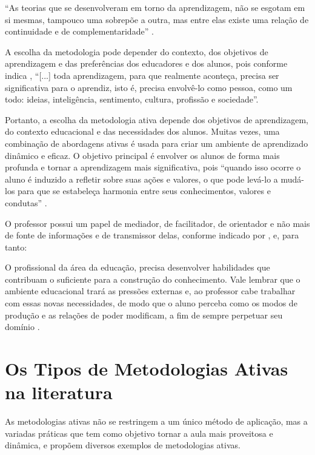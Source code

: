 ``As teorias que se desenvolveram em torno da aprendizagem, não se esgotam em si mesmas, tampouco uma sobrepõe a outra, mas entre elas existe uma relação de continuidade e de complementaridade'' \cite[p. 5]{LACERDA2023}.

A escolha da metodologia pode depender do contexto, dos objetivos de aprendizagem e das preferências dos educadores e dos alunos, pois conforme indica , ``[...] toda aprendizagem, para que realmente aconteça, precisa ser significativa para o aprendiz, isto é, precisa envolvê-lo como pessoa, como um todo: ideias, inteligência, sentimento, cultura, profissão e sociedade''.

Portanto, a escolha da metodologia ativa depende dos objetivos de aprendizagem, do contexto educacional e das necessidades dos alunos. Muitas vezes, uma combinação de abordagens ativas é usada para criar um ambiente de aprendizado dinâmico e eficaz. O objetivo principal é envolver os alunos de forma mais profunda e tornar a aprendizagem mais significativa, pois ``quando isso ocorre o aluno é induzido a refletir sobre suas ações e valores, o que pode levá-lo a mudá-los para que se estabeleça harmonia entre seus conhecimentos, valores e condutas'' \cite[p. 315]{FRASSON2019}.

O professor possui um papel de mediador, de facilitador, de orientador e não mais de fonte de informações e de transmissor delas, conforme indicado por 
, e, para tanto:

\begin{citacao}
    O profissional da área da educação, precisa desenvolver habilidades que contribuam o suficiente para a construção do conhecimento. Vale lembrar que o ambiente educacional trará as pressões externas e, ao professor cabe trabalhar com essas novas necessidades, de modo que o aluno perceba como os modos de produção e as relações de poder modificam, a fim de sempre perpetuar seu domínio \cite[p. 4]{NathBragaTeixeira2017}.
\end{citacao}

\section{Os Tipos de Metodologias Ativas na literatura} \label{sec:2.2_TiposMetAtiv}

As metodologias ativas não se restringem a um único método de aplicação, mas a variadas práticas que tem como objetivo tornar a aula mais proveitosa e dinâmica, e  propõem diversos exemplos de metodologias ativas.


